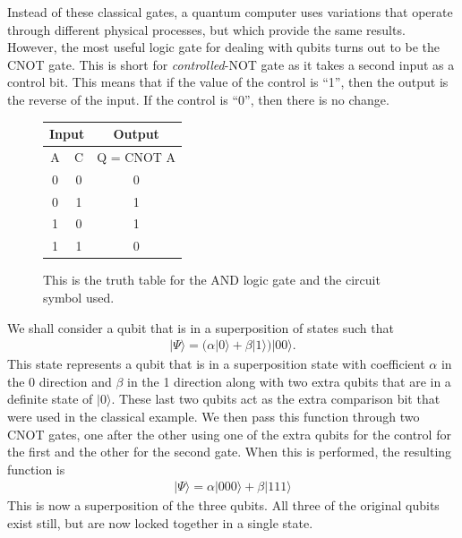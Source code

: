 Instead of these classical gates, a quantum computer uses variations that operate through different physical processes, but which provide the same results. However, the most useful logic gate for dealing with qubits turns out to be the CNOT gate. This is short for \emph{controlled}-NOT gate as it takes a second input as a control bit. This means that if the value of the control is ``1'', then the output is the reverse of the input. If the control is ``0'', then there is no change.
\begin{figure}[ht]
	\centering
	\begin{minipage}[c]{0.45\linewidth}
		\centering
	 	\begin{tabular}{c|c|c}
			\multicolumn{2}{c|}{Input} & Output\\ \hline
			A & C & Q = CNOT A \\ \hline
			0 & 0 & 0 \\
			0 & 1 & 1 \\
			1 & 0 & 1 \\
			1 & 1 & 0
		\end{tabular}
		\caption{\label{tab:CNOT}This is the truth table for the AND logic gate and the circuit symbol used.}
	\end{minipage}
	\begin{minipage}[c]{0.45\linewidth}
		\centering
		
	\end{minipage}
\end{figure}

We shall consider a qubit that is in a superposition of states such that 
\begin{align}
	|\Psi\rangle = \big(\alpha|0\rangle + \beta|1\rangle\big)|00\rangle.
\end{align}
This state represents a qubit that is in a superposition state with coefficient $\alpha$ in the 0 direction and $\beta$ in the 1 direction along with two extra qubits that are in a definite state of $|0\rangle$. These last two qubits act as the extra comparison bit that were used in the classical example. We then pass this function through two CNOT gates, one after the other using one of the extra qubits for the control for the first and the other for the second gate. When this is performed, the resulting function is
\begin{align}
	|\Psi\rangle = \alpha|000\rangle + \beta|111\rangle
\end{align}
This is now a superposition of the three qubits. All three of the original qubits exist still, but are now locked together in a single state. 

